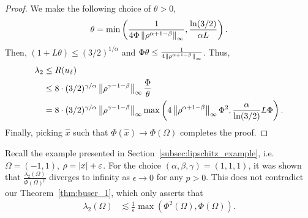 \begin{proof}
We make the following choice of $\theta>0$,
\begin{align*}
\theta = \min\left(\frac{1}{4\Phi\left\lVert \rho^{\alpha+1-\beta} \right\rVert_\infty}, \frac{\ln(3/2)}{\alpha L} \right).
\end{align*}
Then, $(1+L\theta)\leq (3/2)^{1/\alpha}$ and $\Phi\theta \leq \frac{1}{4\left\lVert \rho^{\alpha+1-\beta} \right\rVert_\infty}$. Thus,
\begin{align*}
\lambda_2 &\leq R(u_\delta)\\
&\leq 8\cdot (3/2)^{\gamma/\alpha} \left\lVert \rho^{\gamma -1 - \beta} \right\rVert_\infty \frac{\Phi}{\theta}\\
&= 8\cdot (3/2)^{\gamma/\alpha} \left\lVert \rho^{\gamma -1 - \beta} \right\rVert_\infty \max\left(4\left\lVert \rho^{\alpha+1-\beta} \right\rVert_\infty \Phi^2, \frac{\alpha}{\ln(3/2)}L\Phi\right).
\end{align*}
Finally, picking $\hat x$ such that $\Phi(\hat x)\to \Phi(\Omega)$ completes the proof.
\end{proof}

\begin{remark}
Recall the example presented in Section~\ref{subsec:lipschitz_example}, i.e. $\Omega = (-1,1)$, $\rho = \left| x \right|+\varepsilon$. For the choice $(\alpha,\beta,\gamma) = (1,1,1)$, it was shown that $\frac{\lambda_2(\Omega)}{\Phi(\Omega)^{p}}$ diverges to infinity as $\epsilon\to 0$ for any $p>0$. This does not contradict our Theorem~\ref{thm:buser_1}, which only asserts that
\begin{align*}
\lambda_2(\Omega) &\lesssim \frac{1}{\epsilon}\max\left(\Phi^{2}(\Omega),\Phi(\Omega)\right).
\end{align*}
\end{remark}
